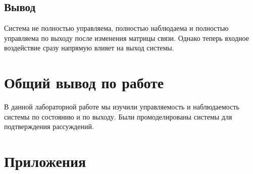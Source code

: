 \documentclass[a4paper, 12pt]{article}
\begin{document}
    \subsection{Вывод}
    Система не полностью управляема, полностью наблюдаема и полностью управляема по выходу после изменения матрицы связи.
    Однако теперь входное воздействие сразу напрямую влияет на выход системы.
    

    \section{Общий вывод по работе}
    В данной лабораторной работе мы изучили управляемость и наблюдаемость системы по состоянию и по выходу.
    Были промоделированы системы для подтверждения рассуждений.


    \section{Приложения}
\end{document}
